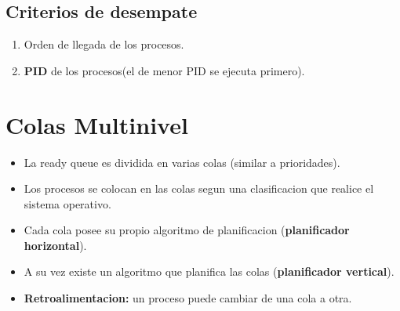 \documentclass[11pt]{article}
\begin{document}
\subsection{Criterios de desempate}
\begin{enumerate}
    \item Orden de llegada de los procesos.
    \item \textbf{PID} de los procesos(el de menor PID se ejecuta primero).
\end{enumerate}


\section{Colas Multinivel}
\begin{itemize}
    \item La ready queue es dividida en varias colas (similar a prioridades).
    \item Los procesos se colocan en las colas segun una clasificacion que realice el sistema operativo.
    \item Cada cola posee su propio algoritmo de planificacion (\textbf{planificador horizontal}).
    \item A su vez existe un algoritmo que planifica las colas (\textbf{planificador vertical}).
    \item \textbf{Retroalimentacion:} un proceso puede cambiar de una cola a otra.
\end{itemize}
\end{document}
